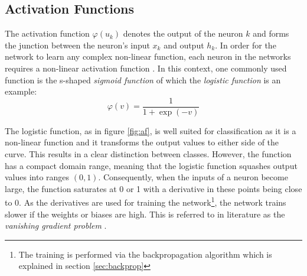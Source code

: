 \subsection{Activation Functions}
The activation function $\varphi(u_k)$ denotes the output of the neuron $k$ and forms the junction between the neuron's input $x_k$ and output $h_k$. In order for the network to learn any complex non-linear function, each neuron in the networks requires a non-linear activation function \cite{Goodfellow-et-al-2016}. In this context, one commonly used function is the s-shaped \textit{sigmoid function} of which the \textit{logistic function} \cite{Haykin:1998:NNC:521706} is an example:\\

\begin{equation}
 \varphi(v) = \frac{1}{1 + \exp(-v)} 
\end{equation}

The logistic function, as in figure \ref{fig:af}, is well suited for classification as it is a non-linear function and it transforms the output values to either side of the curve. This results in a clear distinction between classes. However, the function has a compact domain range, meaning that the logistic function squashes output values into ranges $(0, 1)$. Consequently, when the inputs of a neuron become large, the function saturates at 0 or 1 with a derivative in these points being close to 0. As the derivatives are used for training the network\footnote{The training is performed via the backpropagation algorithm which is explained in section \ref{sec:backprop}}, the network trains slower if the weights or biases are high. This is referred to in literature as the \textit{vanishing gradient problem} \cite{Nair:2010:RLU:3104322.3104425}.\\

